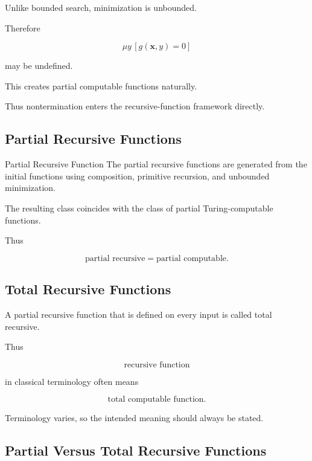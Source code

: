 Unlike bounded search, minimization is unbounded.

Therefore

\[
\boxed{
\mu y
\,
[g(\mathbf{x},y)=0]
}
\]

may be undefined.

This creates partial computable functions naturally.

Thus nontermination enters the recursive-function framework directly.

\subsection{Partial Recursive Functions}
\label{subsec:partial-recursive-functions}

\begin{definitionbox}{Partial Recursive Function}
The partial recursive functions are generated from the initial functions
using composition, primitive recursion, and unbounded minimization.
\end{definitionbox}

The resulting class coincides with the class of partial Turing-computable
functions.

Thus

\[
\boxed{
\text{partial recursive}
=
\text{partial computable}.
}
\]

\subsection{Total Recursive Functions}
\label{subsec:total-recursive-functions}

A partial recursive function that is defined on every input is called total
recursive.

Thus

\[
\boxed{
\text{recursive function}
}
\]

in classical terminology often means

\[
\boxed{
\text{total computable function}.
}
\]

Terminology varies, so the intended meaning should always be stated.

\subsection{Partial Versus Total Recursive Functions}
\label{subsec:partial-total-recursive}

